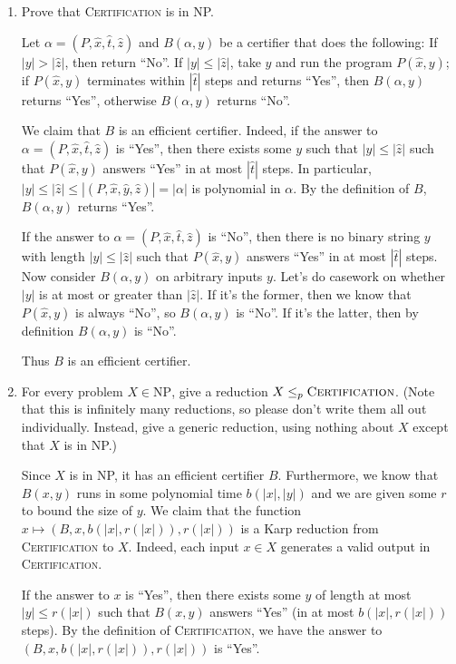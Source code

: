 \documentclass[10pt]{article}
\begin{document}
\begin{enumerate}
\item Prove that \textsc{Certification} is in NP.

Let \(\alpha = (P, \hat{x}, \hat t, \hat z)\) and \(B(\alpha, y)\) be a certifier that does the following: If \(|y| > |\hat z|\), then return ``No''. If \(|y| \leq |\hat z|\), take \(y\) and run the program \(P(\hat x, y)\); if \(P(\hat x, y)\) terminates within \(|\hat t|\) steps and returns ``Yes'', then \(B(\alpha, y)\) returns ``Yes'', otherwise \(B(\alpha, y)\) returns ``No''.

We claim that \(B\) is an efficient certifier. Indeed, if the answer to \(\alpha = (P, \hat{x}, \hat t, \hat z)\) is ``Yes'', then there exists some \(y\) such that \(|y| \leq |\hat z|\) such that \(P(\hat x, y)\) answers ``Yes'' in at most \(|\hat t|\) steps. In particular, \(|y| \leq |\hat z| \leq |(P, \hat x, \hat y, \hat z)| = |\alpha|\) is polynomial in \(\alpha\). By the definition of \(B\), \(B(\alpha, y)\) returns ``Yes''.

If the answer to \(\alpha = (P, \hat{x}, \hat t, \hat z)\) is ``No'', then there is no binary string \(y\) with length \(|y| \leq |\hat z|\) such that \(P(\hat x, y)\) answers ``Yes'' in at most \(|\hat t|\) steps. Now consider \(B(\alpha, y)\) on arbitrary inputs \(y\). Let's do casework on whether \(|y|\) is at most or greater than \(|\hat z|\). If it's the former, then we know that \(P(\hat x, y)\) is always ``No'', so \(B(\alpha, y)\) is ``No''. If it's the latter, then by definition \(B(\alpha, y)\) is ``No''.

Thus \(B\) is an efficient certifier.

\item For every problem $X \in \text{NP}$, give a reduction $X \leq_p \text{\textsc{Certification}}$. (Note that this is infinitely many reductions, so please don't write them all out individually. Instead, give a generic reduction, using nothing about $X$ except that $X$ is in NP.)

Since \(X\) is in NP, it has an efficient certifier \(B\). Furthermore, we know that \(B(x, y)\) runs in some polynomial time \(b(|x|, |y|)\) and we are given some \(r\) to bound the size of \(y\). We claim that the function \(x \mapsto (B, x, b(|x|, r(|x|)), r(|x|))\) is a Karp reduction from \textsc{Certification} to \(X\). Indeed, each input \(x \in X\) generates a valid output in \textsc{Certification}. 

If the answer to \(x\) is ``Yes'', then there exists some \(y\) of length at most \(|y| \leq r(|x|)\) such that \(B(x, y)\) answers ``Yes'' (in at most \(b(|x|, r(|x|))\) steps). By the definition of \textsc{Certification}, we have the answer to \((B, x, b(|x|, r(|x|)), r(|x|))\) is ``Yes''.


\end{enumerate}
\end{document}
